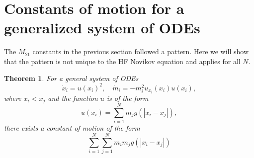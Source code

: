 \documentclass[english,master]{liumaiex}
\theoremstyle{plain}
\newtheorem{theorem}[proposition]{Theorem}
\theoremstyle{definition}
\begin{document}
\section{Constants of motion for a generalized system of ODEs}

The $M_{21}$ constants in the previous section followed a pattern. Here we will show that the pattern is not unique to the HF Novikov equation and applies for all $N$.

\begin{theorem}
	For a general system of ODEs
	\begin{equation}
		\dot{x}_i = u(x_i)^2,
		\quad
		\dot{m}_i = -m_i^2 u_{x_i}(x_i) u(x_i),
	\end{equation}
	where $x_i < x_j$ and the function $u$ is of the form
	\begin{equation}
		u(x_i) = \sum_{i=1}^{N} m_j g(|x_i - x_j|),
	\end{equation}
	there exists a constant of motion of the form
	\begin{equation}
		\sum_{i=1}^{N}\sum_{j=1}^N m_i m_j g(|x_i - x_j|)
	\end{equation}
\end{theorem}
\end{document}
